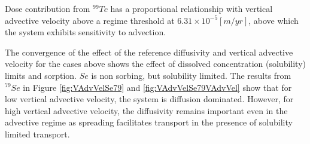 Dose contribution from $^{99}Tc$ has a proportional 
relationship with vertical advective velocity above a regime threshold at 
$6.31\times10^{-5}[m/yr]$, above which the system exhibits sensitivity to 
advection. 

The convergence of the effect of the reference diffusivity and vertical 
advective velocity for the cases above shows the effect of dissolved 
concentration (solubility) limits and sorption. $Se$ is non sorbing, but 
solubility limited.  The results from $^{79}Se$ in Figure \ref{fig:VAdvVelSe79} 
and \ref{fig:VAdvVelSe79VAdvVel} show that for low vertical advective velocity, 
the system is diffusion dominated.  However, for high vertical advective 
velocity, the diffusivity remains important even in the advective regime as 
spreading facilitates transport in the presence of solubility limited transport. 
